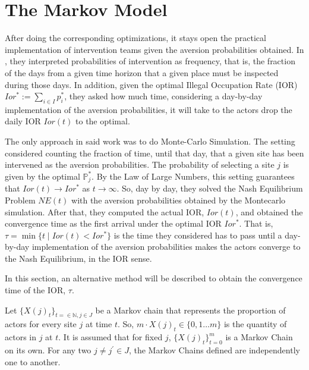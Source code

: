 \documentclass{article}
\newcommand{\p}{\mathds{P}}
\begin{document}
\section{The Markov Model}\label{sec3}
After doing the corresponding optimizations, it stays open the practical implementation of intervention teams given the aversion probabilities obtained. In \citep{Carrasco}, they interpreted probabilities of intervention as frequency, that is, the fraction of the days from a given time horizon that a given place must be inspected during those days. In addition, given the optimal Illegal Occupation Rate (IOR) $Ior^* := \sum\limits_{i \in I} p^*_i$, they asked how much time, considering a day-by-day implementation of the aversion probabilities, it will take to the actors drop the daily IOR $Ior(t)$ to the optimal.\par
The only approach in said work was to do Monte-Carlo Simulation. The setting considered counting the fraction of time, until that day, that a given site has been intervened as the aversion probabilities. The probability of selecting a site $j$ is given by the optimal $\p^*_j$. By the Law of Large Numbers, this setting guarantees that $Ior(t) \rightarrow Ior^*$ as $t\rightarrow \infty$. So, day by day, they solved the Nash Equilibrium Problem $NE(t)$ with the aversion probabilities obtained by the Montecarlo simulation. After that, they computed the actual IOR, $Ior(t)$, and obtained the convergence time as the first arrival under the optimal IOR $Ior^*$. That is, $\tau = \min \{t \;\vert\; Ior(t) < Ior^*\}$ is the time they considered has to pass until a day-by-day implementation of the aversion probabilities makes the actors converge to the Nash Equilibrium, in the IOR sense.\par
In this section, an alternative method will be described to obtain the convergence time of the IOR, $\tau$.\par
Let $\{X(j)_t\}_{t=\in \mathbb{N}, j \in J}$ be a Markov chain that represents the proportion of actors for every site $j$ at time $t$. So, $m\cdot X(j)_t \in \{0,1 \dots m\}$ is the quantity of actors in $j$ at $t$. It is assumed that for fixed $j$, $\{X(j)_{t}\}_{t=0}^m$ is a Markov Chain on its own. For any two $j \not= j^{'} \in J$, the Markov Chains defined are independently one to another.\par
\end{document}
